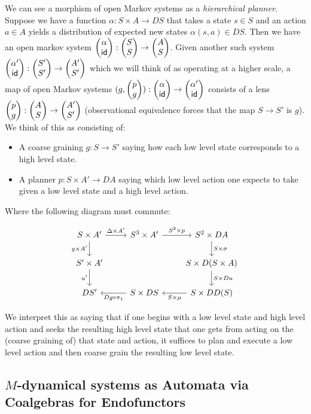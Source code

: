 We can see a morphism of open Markov systems as a \emph{hierarchical planner}.
Suppose we have a function $\alpha  : S \times A \to D S$ that takes a state $s \in S$
and an action $a \in A$ yields a distribution of expected new states $\alpha(s,
a) \in DS$. Then we have an
open markov system $\begin{pmatrix}{\alpha} \\ {\operatorname{\mathsf{id}}} \end{pmatrix} : \begin{pmatrix}{S} \\ {S} \end{pmatrix} \to \begin{pmatrix}{A} \\ {S} \end{pmatrix}$. Given
another such system $\begin{pmatrix}{\alpha'} \\ {\operatorname{\mathsf{id}}} \end{pmatrix} : \begin{pmatrix}{S'} \\ {S'} \end{pmatrix} \to \begin{pmatrix}{A'} \\ {S'} \end{pmatrix}$
which we will think of as operating at a higher scale, a
map of open Markov systems $(g, \begin{pmatrix}{p} \\ {g} \end{pmatrix}) : \begin{pmatrix}{\alpha} \\ {\operatorname{\mathsf{id}}} \end{pmatrix} \to
\begin{pmatrix}{\alpha'} \\ {\operatorname{\mathsf{id}}} \end{pmatrix}$ consists of a lens $\begin{pmatrix}{p} \\ {g} \end{pmatrix} : \begin{pmatrix}{A} \\ {S} \end{pmatrix} \to
\begin{pmatrix}{A'} \\ {S'} \end{pmatrix}$ (observational equivalence forces that the map $S \to S'$ is
$g$). We think of this as consisting of:
\begin{itemize}
\item A coarse graining $g : S \to S'$ saying how each low level state
  corresponds to a high level state.
  \item A planner $p : S \times A' \to D A$ saying which low level action one
    expects to take given a low level state and a high level action.  
  \end{itemize}
  Where the following diagram must commute:

  \[
      \begin{tikzcd}
S \times A' \arrow[r, "\Delta \times A'"] \arrow[d, "g \times A'"'] & S^3 \times A' \arrow[r, "S^2 \times p"]  & S^2 \times DA \arrow[d, "S \times \sigma"]      \\
S' \times A' \arrow[d, "u'"']                                       &                                          & S \times D(S \times A) \arrow[d, "S \times Du"] \\
D S'                                                                & S \times D S \arrow[l, "Dg \circ \pi_1"] & S\times DD(S) \arrow[l, "S \times \mu"]        
\end{tikzcd}
  \]

We interpret this as saying that if one begins with a low level state and high
level action and seeks the resulting high level state that one gets from acting
on the (coarse graining of) that state and action, it suffices to plan and execute a low level action and then coarse grain the
resulting low level state.

\subsection{$M$-dynamical systems as Automata via Coalgebras for Endofunctors}

